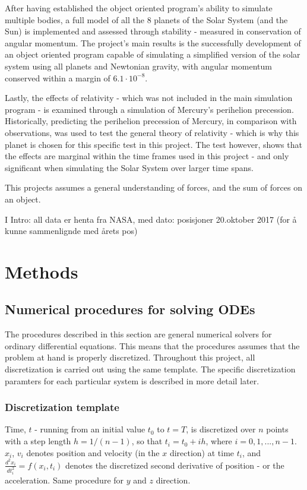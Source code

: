 \documentclass[%
oneside,                 %
final,                   %
10pt]{article}
\begin{document}
After having established the object oriented program's ability to simulate multiple bodies, a full model of all the 8 planets of the Solar System (and the Sun) is implemented and assessed through stability - measured in conservation of angular momentum. The project's main results is the successfully development of an object oriented program capable of simulating a simplified version of the solar system using all planets and Newtonian gravity, with angular momentum conserved within a margin of $6.1 \cdot 10^{-8}$. \newline

Lastly, the effects of relativity - which was not included in the main simulation program - is examined through a simulation of Mercury's perihelion precession. Historically, predicting the perihelion precession of Mercury, in comparison with observations, was used to test the general theory of relativity - which is why this planet is chosen for this specific test in this project. The test however, shows that the effects are marginal within the time frames used in this project - and only significant when simulating the Solar System over larger time spans. \newline

This projects assumes a general understanding of forces, and the sum of forces on an object.

I Intro: all data er henta fra NASA, med dato: posisjoner 20.oktober 2017 (for å kunne sammenlignde med årets pos)


\section{Methods}

\subsection{Numerical procedures for solving ODEs}
\label{sec:NPs}
The procedures \cite{HJ-ODE} described in this section are general numerical solvers for ordinary differential equations. This means that the procedures assumes that the problem at hand is properly discretized.  Throughout this project, all discretization is carried out using the same template. The specific discretization paramters for each particular system is described in more detail later.  \newline

\subsubsection*{Discretization template}
Time, $t$ - running from an initial value $t_0$ to $t=T$,  is discretized over $n$ points with a step length $h=1/(n-1)$, so that $t_i=t_0 + ih$, where $i=0,1,...,n-1$. $x_i$, $v_i$ denotes position and velocity (in the $x$ direction) at time $t_i$, and $\frac{d^2x_i}{dt_i^2}=f(x_i,t_i)$ denotes the discretized second derivative of position - or the acceleration. Same procedure for $y$ and $z$ direction.
\end{document}
